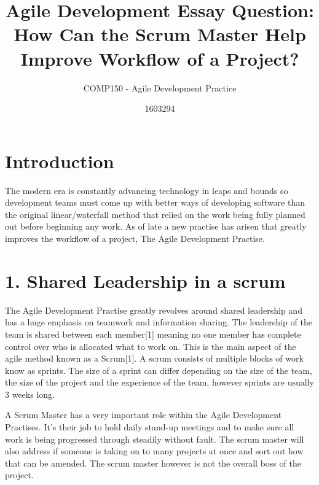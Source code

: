 \documentclass{scrartcl}
\title{Agile Development Essay Question: How Can the Scrum Master Help Improve Workflow of a Project?}
\subtitle{COMP150 - Agile Development Practice}
\author{1603294}
\begin{document}
\maketitle


\section{Introduction}

The modern era is constantly advancing technology in leaps and bounds so development teams must come up with better ways of developing software than the original linear/waterfall method that relied on the work being fully planned out before beginning any work. As of late a new practise has arisen that greatly improves the workflow of a project, The Agile Development Practise. 

\section{1. Shared Leadership in a scrum}

The Agile Development Practise greatly revolves around shared leadership and has a huge emphasis on teamwork and information sharing. The leadership of the team is shared between each member[1] meaning no one member has complete control over who is allocated what to work on. This is the main aspect of the agile method known as a Scrum[1]. A scrum consists of multiple blocks of work know as sprints. The size of a sprint can differ depending on the size of the team, the size of the project and the experience of the team, however sprints are usually 3 weeks long.

A Scrum Master has a very important role within the Agile Development Practises. It's their job to hold daily stand-up meetings and to make sure all work is being progressed through steadily without fault. The scrum master will also address if someone is taking on to many projects at once and sort out how that can be amended. The scrum master however is not the overall boss of the project.
\end{document}
